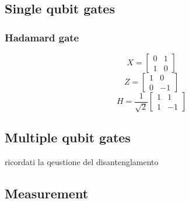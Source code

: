 \subsection{Single qubit gates}

\subsubsection{Hadamard gate}
\begin{equation}
    X = 
    \begin{bmatrix}
    0 & 1\\
    1 & 0
    \end{bmatrix}
\end{equation}
\begin{equation}
    Z = 
    \begin{bmatrix}
    1 & 0\\
    0 & -1
    \end{bmatrix}
\end{equation}
\begin{equation}
    H = \frac{1}{\sqrt{2}}
    \begin{bmatrix}
    1 & 1\\
    1 & -1
    \end{bmatrix}
\end{equation}
\subsection{Multiple qubit gates}
ricordati la qeustione del disantenglamento
\subsection{Measurement}\label{sec:measurement}
